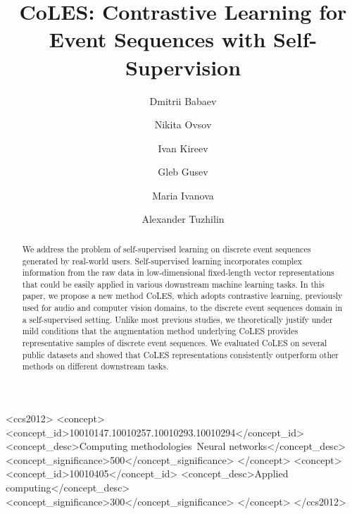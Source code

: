 \documentclass[sigconf]{acmart}
\begin{document}
\title{CoLES: Contrastive Learning for Event Sequences with Self-Supervision}

\author{Dmitrii Babaev}

\author{Nikita Ovsov}

\author{Ivan Kireev}

\author{Gleb Gusev}

\author{Maria Ivanova}

\author{Alexander Tuzhilin}

\begin{abstract}
We address the problem of self-supervised learning on discrete event sequences generated by real-world users. Self-supervised learning incorporates complex information from the raw data in low-dimensional fixed-length vector representations that could be easily applied in various downstream machine learning tasks. In this paper, we propose a new method CoLES, which adopts contrastive learning, previously used for audio and computer vision domains, to the discrete event sequences domain in a self-supervised setting. Unlike most previous studies, we theoretically justify under mild conditions that the augmentation method underlying CoLES provides representative samples of discrete event sequences. We evaluated CoLES on several public datasets and showed that CoLES representations  
consistently outperform other methods on different downstream tasks.
\end{abstract}

\begin{CCSXML}
<ccs2012>
<concept>
<concept_id>10010147.10010257.10010293.10010294</concept_id>
<concept_desc>Computing methodologies~Neural networks</concept_desc>
<concept_significance>500</concept_significance>
</concept>
<concept>
<concept_id>10010405</concept_id>
<concept_desc>Applied computing</concept_desc>
<concept_significance>300</concept_significance>
</concept>
</ccs2012>
\end{CCSXML}
\end{document}
